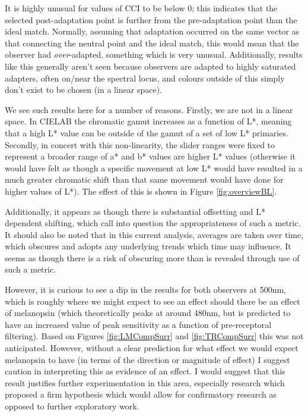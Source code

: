 It is highly unusual for values of \gls{CCI} to be below 0; this indicates that the selected post-adaptation point is further from the pre-adaptation point than the ideal match. Normally, assuming that adaptation occurred on the same vector as that connecting the neutral point and the ideal match, this would mean that the observer had \emph{over}-adapted, something which is very unusual. Additionally, results like this generally aren't seen because observers are adapted to highly saturated adapters, often on/near the spectral locus, and colours outside of this simply don't exist to be chosen (in a linear space). 

We see such results here for a number of reasons. Firstly, we are not in a linear space. In CIELAB the chromatic gamut increases as a function of L*, meaning that a high L* value can be outside of the gamut of a set of low L* primaries. Secondly, in concert with this non-linearity, the slider ranges were fixed to represent a broader range of a* and b* values are higher L* values (otherwise it would have felt as though a specific movement at low L* would have resulted in a much greater chromatic shift than that same movement would have done for higher values of L*). The effect of this is shown in Figure \ref{fig:overviewBL}.

Additionally, it appears as though there is substantial offsetting and L* dependent shifting, which call into question the appropriateness of such a metric. It should also be noted that in this current analysis, averages are taken over time, which obscures and adopts any underlying trends which time may influence. It seems as though there is a risk of obscuring more than is revealed through use of such a metric.

However, it is curious to see a dip in the results for both observers at 500nm, which is roughly where we might expect to see an effect should there be an effect of melanopsin (which theoretically peaks at around 480nm, but is predicted to have an increased value of peak sensitivity as a function of pre-receptoral filtering). Based on Figures \ref{fig:LMCompSurr} and \ref{fig:TRCompSurr} this was not anticipated. However, without a clear prediction for what effect we would expect melanopsin to have (in terms of the direction or magnitude of effect) I suggest caution in interpreting this as evidence of an effect. I would suggest that this result justifies further experimentation in this area, especially research which proposed a firm hypothesis which would allow for confirmatory research as opposed to further exploratory work.


